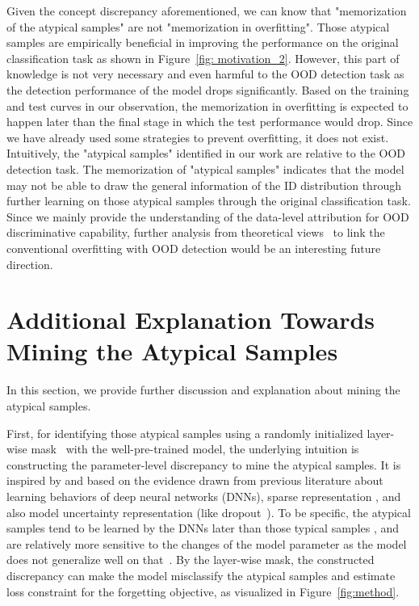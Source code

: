 \documentclass{article}
\theoremstyle{plain}
\theoremstyle{definition}
\theoremstyle{remark}
\begin{document}
Given the concept discrepancy aforementioned, we can know that "memorization of the atypical samples" are not "memorization in overfitting". Those atypical samples are empirically beneficial in improving the performance on the original classification task as shown in Figure~\ref{fig: motivation_2}. However, this part of knowledge is not very necessary and even harmful to the OOD detection task as the detection performance of the model drops significantly. Based on the training and test curves in our observation, the memorization in overfitting is expected to happen later than the final stage in which the test performance would drop. Since we have already used some strategies to prevent overfitting, it does not exist. Intuitively, the "atypical samples" identified in our work are relative to the OOD detection task. The memorization of "atypical samples" indicates that the model may not be able to draw the general information of the ID distribution through further learning on those atypical samples through the original classification task. Since we mainly provide the understanding of the data-level attribution for OOD discriminative capability, further analysis from theoretical views~\citep{fang2022is} to link the conventional overfitting with OOD detection would be an interesting future direction.


\section{Additional Explanation Towards Mining the Atypical Samples}
\label{app:atypical_mining}

In this section, we provide further discussion and explanation about mining the atypical samples.

First, for identifying those atypical samples using a randomly initialized layer-wise mask~\citep{ramanujan2020s} with the well-pre-trained model, the underlying intuition is constructing the parameter-level discrepancy to mine the atypical samples. It is inspired by and based on the evidence drawn from previous literature about learning behaviors \citep{arpit2017closer,goodfellow2016deep} of deep neural networks (DNNs), sparse representation \citep{DBLP:journals/corr/abs-1803-03635,10.1007/978-3-642-42051-1_16,barham2022pathways}, and also model uncertainty representation (like dropout~\citep{gal2016dropout}). To be specific, the atypical samples tend to be learned by the DNNs later than those typical samples \citep{arpit2017closer}, and are relatively more sensitive to the changes of the model parameter as the model does not generalize well on that~\citep{booktitles_jmlr_dropout,gal2016dropout}. By the layer-wise mask, the constructed discrepancy can make the model misclassify the atypical samples and estimate loss constraint for the forgetting objective, as visualized in Figure~\ref{fig:method}.
\end{document}
